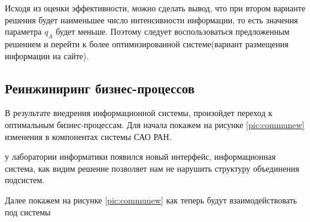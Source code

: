 Исходя из оценки эффективности, можно сделать вывод, что при втором варианте решения будет наименьшее число интенсивности информации, то есть значения параметра $q_A$ будет меньше. Поэтому следует воспользоваться предложенным решением и перейти к более оптимизированной системе(вариант размещения информации на сайте). 

\subsection{Реинжиниринг бизнес-процессов}

В результате внедрения информационной системы, произойдет переход к оптимальным бизнес-процессам. Для начала покажем на рисунке \ref{pic:communew} изменения в компонентах системы САО РАН. 


у лаборатории информатики появился новый интерфейс, информационная система, как видим решение позволяет нам не нарушить структуру объединения подсистем. 

Далее покажем на рисунке \ref{pic:communew} как теперь будут взаимодействовать под системы 
 
\pagebreak